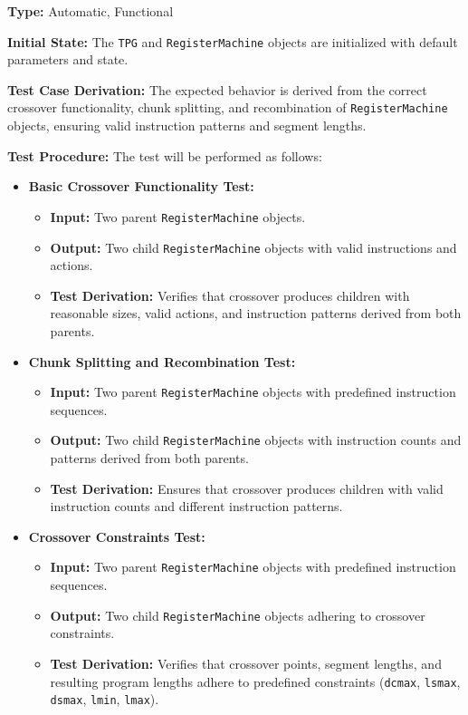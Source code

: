 \documentclass[12pt, titlepage]{article}
\begin{document}
\textbf{Type:} Automatic, Functional

\textbf{Initial State:} The \texttt{TPG} and \texttt{RegisterMachine} objects are initialized with default parameters and state.

\textbf{Test Case Derivation:} The expected behavior is derived from the correct crossover functionality, chunk splitting, and recombination of \texttt{RegisterMachine} objects, ensuring valid instruction patterns and segment lengths.

\textbf{Test Procedure:} The test will be performed as follows:
\begin{itemize}
    \item \textbf{Basic Crossover Functionality Test:}
    \begin{itemize}
        \item \textbf{Input:} Two parent \texttt{RegisterMachine} objects.
        \item \textbf{Output:} Two child \texttt{RegisterMachine} objects with valid instructions and actions.
        \item \textbf{Test Derivation:} Verifies that crossover produces children with reasonable sizes, valid actions, and instruction patterns derived from both parents.
    \end{itemize}

    \item \textbf{Chunk Splitting and Recombination Test:}
    \begin{itemize}
        \item \textbf{Input:} Two parent \texttt{RegisterMachine} objects with predefined instruction sequences.
        \item \textbf{Output:} Two child \texttt{RegisterMachine} objects with instruction counts and patterns derived from both parents.
        \item \textbf{Test Derivation:} Ensures that crossover produces children with valid instruction counts and different instruction patterns.
    \end{itemize}

    \item \textbf{Crossover Constraints Test:}
    \begin{itemize}
        \item \textbf{Input:} Two parent \texttt{RegisterMachine} objects with predefined instruction sequences.
        \item \textbf{Output:} Two child \texttt{RegisterMachine} objects adhering to crossover constraints.
        \item \textbf{Test Derivation:} Verifies that crossover points, segment lengths, and resulting program lengths adhere to predefined constraints (\texttt{dcmax}, \texttt{lsmax}, \texttt{dsmax}, \texttt{lmin}, \texttt{lmax}).
    \end{itemize}
\end{itemize}
\end{document}
